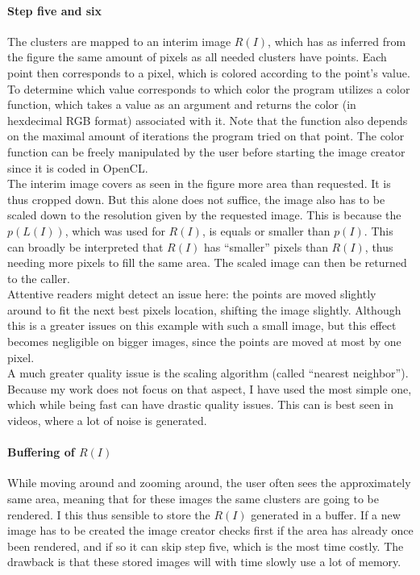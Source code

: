 \documentclass[12pt,a4paper,titlepage]{article}
\begin{document}
	\paragraph{Step five and six}
	The clusters are mapped to an interim image \(R(I)\), which has as inferred from the figure the same amount of pixels as all needed clusters have points. Each point then corresponds to a pixel, which is colored according to the point's value. To determine which value corresponds to which color the program utilizes a color function, which takes a value as an argument and returns the color (in hexdecimal RGB format) associated with it. Note that the function also depends on the maximal amount of iterations the program tried on that point. The color function can be freely manipulated by the user before starting the image creator since it is coded in OpenCL.\\
	The interim image covers as seen in the figure more area than requested. It is thus cropped down. But this alone does not suffice, the image also has to be scaled down to the resolution given by the requested image. This is because the \(p(L(I))\), which was used for \(R(I)\), is equals or smaller than \(p(I)\). This can broadly be interpreted that \(R(I)\) has ``smaller'' pixels than \(R(I)\), thus needing more pixels to fill the same area. The scaled image can then be returned to the caller.\\
	Attentive readers might detect an issue here: the points are moved slightly around to fit the next best pixels location, shifting the image slightly. Although this is a greater issues on this example with such a small image, but this effect becomes negligible on bigger images, since the points are moved at most by one pixel.\\
	A much greater quality issue is the scaling algorithm (called ``nearest neighbor''). Because my work does not focus on that aspect, I have used the most simple one, which while being fast can have drastic quality issues. This can is best seen in videos, where a lot of noise is generated.\\
	\paragraph{Buffering of \(R(I)\)}
	While moving around and zooming around, the user often sees the approximately same area, meaning that for these images the same clusters are going to be rendered. I this thus sensible to store the \(R(I)\) generated in a buffer. If a new image has to be created the image creator checks first if the area has already once been rendered, and if so it can skip step five, which is the most time costly. The drawback is that these stored images will with time slowly use a lot of memory.
\end{document}
